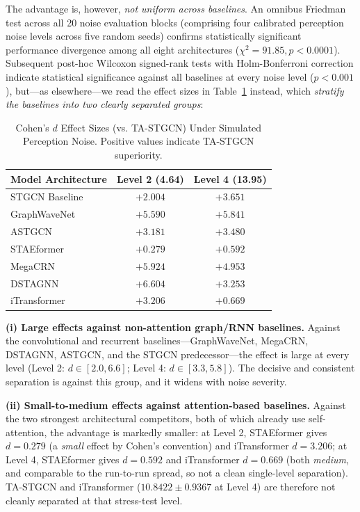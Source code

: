 \documentclass[preprint,12pt]{elsarticle}
\begin{document}
The advantage is, however, \emph{not uniform across baselines}. An omnibus Friedman test across all 20 noise evaluation blocks (comprising four calibrated perception noise levels across five random seeds) confirms statistically significant performance divergence among all eight architectures ($\chi^2 = 91.85, p < 0.0001$). Subsequent post-hoc Wilcoxon signed-rank tests with Holm-Bonferroni correction indicate statistical significance against all baselines at every noise level ($p < 0.001$), but---as elsewhere---we read the effect sizes in Table~\ref{tab:noise_robustness_effects} instead, which \emph{stratify the baselines into two clearly separated groups}:

\begin{table}[htbp]
\centering
\footnotesize
\setlength{\tabcolsep}{4pt}
\renewcommand{\arraystretch}{1.1}
\caption{Cohen's $d$ Effect Sizes (vs. TA-STGCN) Under Simulated Perception Noise. Positive values indicate TA-STGCN superiority.}
\label{tab:noise_robustness_effects}
\begin{tabular}{lcc}
\toprule
\textbf{Model Architecture} & \textbf{Level 2 (4.64)} & \textbf{Level 4 (13.95)} \\
\midrule
STGCN Baseline \citep{stgcn} & $+2.004$ & $+3.651$ \\
GraphWaveNet \citep{wavenet} & $+5.590$ & $+5.841$ \\
ASTGCN \citep{astgcn} & $+3.181$ & $+3.480$ \\
STAEformer \citep{staeformer} & $+0.279$ & $+0.592$ \\
MegaCRN \citep{megacrn} & $+5.924$ & $+4.953$ \\
DSTAGNN \citep{dstagnn} & $+6.604$ & $+3.253$ \\
iTransformer \citep{itransformer} & $+3.206$ & $+0.669$ \\
\bottomrule
\end{tabular}%
\end{table}

\textbf{(i) Large effects against non-attention graph/RNN baselines.} Against the convolutional and recurrent baselines---GraphWaveNet, MegaCRN, DSTAGNN, ASTGCN, and the STGCN predecessor---the effect is large at every level (Level 2: $d \in [2.0, 6.6]$; Level 4: $d \in [3.3, 5.8]$). The decisive and consistent separation is against this group, and it widens with noise severity.

\textbf{(ii) Small-to-medium effects against attention-based baselines.} Against the two strongest architectural competitors, both of which already use self-attention, the advantage is markedly smaller: at Level 2, STAEformer gives $d = 0.279$ (a \emph{small} effect by Cohen's convention) and iTransformer $d = 3.206$; at Level 4, STAEformer gives $d = 0.592$ and iTransformer $d = 0.669$ (both \emph{medium}, and comparable to the run-to-run spread, so not a clean single-level separation). TA-STGCN and iTransformer ($10.8422 \pm 0.9367$ at Level 4) are therefore not cleanly separated at that stress-test level.
\end{document}
